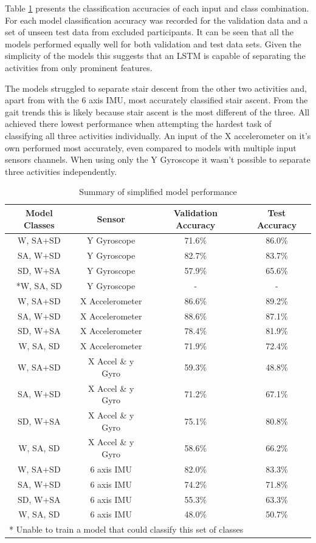 \documentclass[sensors,article,submit,moreauthors,pdftex]{Definitions/mdpi}
\begin{document}
Table \ref{tab:simplified_model_perfomances} presents the classification accuracies of each input and class combination. For each model classification accuracy was recorded for the validation data and a set of unseen test data from excluded participants. It can be seen that all the models performed equally well for both validation and test data sets. Given the simplicity of the models this suggests that an LSTM is capable of separating the activities from only prominent features.

The models struggled to separate stair descent from the other two activities and, apart from with the 6 axis IMU, most accurately classified stair ascent. From the gait trends this is likely because stair ascent is the most different of the three. All achieved there lowest performance when attempting the hardest task of classifying all three activities individually. An input of the X accelerometer on it's own performed most accurately, even compared to models with multiple input sensors channels. When using only the Y Gyroscope it wasn't possible to separate three activities independently.

\begin{table}[!hbt]
    \centering
    \caption{Summary of simplified model performance}
    \label{tab:simplified_model_perfomances}
    \begin{tabular}{cccc}
        \textbf{Model Classes} & \textbf{Sensor} & \textbf{Validation Accuracy} & \textbf{Test Accuracy}\\
        \hline
        W, SA+SD & Y Gyroscope & 71.6\% & 86.0\% \\
        SA, W+SD & Y Gyroscope & 82.7\% & 83.7\% \\
        SD, W+SA & Y Gyroscope & 57.9\% & 65.6\% \\
        *W, SA, SD & Y Gyroscope & - & - \\
        W, SA+SD & X Accelerometer & 86.6\% & 89.2\% \\
        SA, W+SD & X Accelerometer & 88.6\% & 87.1\% \\
        SD, W+SA & X Accelerometer & 78.4\% & 81.9\% \\
        W, SA, SD & X Accelerometer & 71.9\% & 72.4\%\\
        W, SA+SD & X Accel \& y Gyro & 59.3\% & 48.8\% \\
        SA, W+SD & X Accel \& y Gyro & 71.2\% & 67.1\% \\
        SD, W+SA & X Accel \& y Gyro & 75.1\% & 80.8\% \\
        W, SA, SD & X Accel \& y Gyro & 58.6\% & 66.2\%\\
        W, SA+SD & 6 axis IMU & 82.0\% & 83.3\% \\
        SA, W+SD & 6 axis IMU & 74.2\% & 71.8\% \\
        SD, W+SA & 6 axis IMU & 55.3\% & 63.3\% \\
        W, SA, SD & 6 axis IMU & 48.0\% & 50.7\%\\
        \multicolumn{4}{l}{\footnotesize{* Unable to train a model that could classify this set of classes}}
    \end{tabular}
\end{table}
\end{document}
